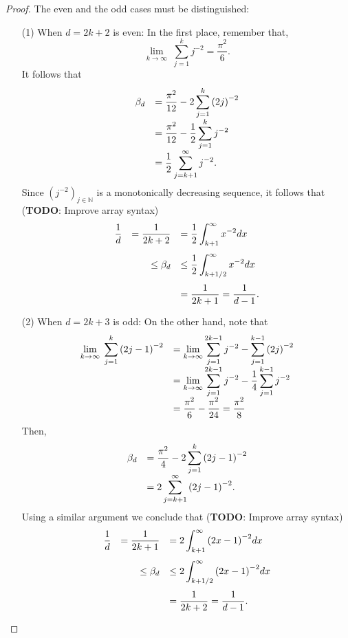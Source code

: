 \documentclass[12pt]{exam}
\def\N{\ensuremath{\mathbb{N}}}
\theoremstyle{remark}
\begin{document}
\begin{proof}
  The even and the odd cases must be distinguished:
  \begin{enumerate}
    \item[(1)] When $d = 2k+2$ is even:
    In the first place, remember that,
    \[ \lim_{k\to\infty}\; \sum_{j = 1}^{k} j^{-2} = \frac{\pi^2}{6}.\] 
    It follows that
    \[\everymath{\displaystyle}
      \begin{array}{rl}
        \beta_d & = \frac{\pi^2}{12} - 2 \sum_{j = 1}^{k} {(2j)}^{-2}\\
        & = \frac{\pi^2}{12} - \frac{1}{2} \sum_{j = 1}^{k} j^{-2}\\
        & = \frac{1}{2} \sum_{j = k+1}^{\infty} j^{-2}.
      \end{array}      
     \]
    Since ${(j^{-2})}_{j \in \N}$ is a monotonically decreasing sequence, it follows that (\textbf{TODO}: Improve array syntax)
    \[\everymath{\displaystyle} 
      \begin{array}{rrl}
        \frac{1}{d}   & = \frac{1}{2k+2}  & = \frac{1}{2} \int_{k+1}^{\infty}x^{-2} dx\\[5mm]
      & \leq \beta_d  & \leq  \frac{1}{2} \int_{k+1/2}^{\infty}x^{-2} dx\\[5mm]
      & & = \frac{1}{2k+1} = \frac{1}{d-1}.
    \end{array}  \] 

    \item[(2)] When $d = 2k+3$ is odd:
    On the other hand, note that
    \[\everymath{\displaystyle} 
      \begin{array}{rl}
      \lim_{k\to\infty} \; \sum_{j = 1}^{k} {(2j-1)}^{-2} 
      & = \lim_{k\to\infty} \sum_{j = 1}^{2k-1} j^{-2} - \sum_{j = 1}^{k-1} {(2j)}^{-2}\\
      & = \lim_{k\to\infty} \sum_{j = 1}^{2k-1} j^{-2} - \frac{1}{4}\sum_{j = 1}^{k-1} j^{-2}\\
      & = \frac{\pi^2}{6}-\frac{\pi^2}{24} = \frac{\pi^2}{8}
    \end{array}\]
    Then,
    \[\everymath{\displaystyle}
    \begin{array}{rl}
      \beta_d & = \frac{\pi^2}{4} - 2 \sum_{j = 1}^{k} {\left(2j-1\right)}^{-2}\\
      & = 2\sum_{j = k+1}^{\infty}{\left(2j-1\right)}^{-2}.\\
    \end{array}      
   \]
   Using a similar argument we conclude that (\textbf{TODO}: Improve array syntax)
   \[\everymath{\displaystyle} 
      \begin{array}{rrl}
        \frac{1}{d}& = \frac{1}{2k+1}  & = 2 \int_{k+1}^{\infty}{(2x-1)}^{-2} dx\\[5mm]
      & \leq \beta_d    & \leq  2 \int_{k+1/2}^{\infty}{(2x-1)}^{-2} dx\\[5mm]
      &  & = \frac{1}{2k+2} = \frac{1}{d-1}.
    \end{array}  \] 
  \end{enumerate}
\end{proof}
\end{document}
